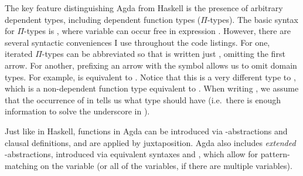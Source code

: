 The key feature distinguishing Agda from Haskell is the presence of arbitrary
dependent types, including dependent function types ($\Pi$-types).
The basic syntax for $\Pi$-types is
\AgdaSymbol{(}\AgdaSpace{}\AgdaSymbol{:}\AgdaSpace{}%
\AgdaSymbol{)}\AgdaSpace{}\AgdaSymbol{$\to$}\AgdaSpace{}%
,
where variable  can occur free in expression .
However, there are several syntactic conveniences I use throughout the code
listings.
For one, iterated $\Pi$-types can be abbreviated so that
\AgdaSymbol{(}\AgdaSpace{}\AgdaSymbol{:}\AgdaSpace{}%
\AgdaSymbol{)}\AgdaSpace{}\AgdaSymbol{$\to$}\AgdaSpace{}%
\AgdaSymbol{(}\AgdaSpace{}\AgdaSymbol{:}\AgdaSpace{}%
\AgdaSymbol{)}\AgdaSpace{}\AgdaSymbol{$\to$}\AgdaSpace{}%
is written just
\AgdaSymbol{(}\AgdaSpace{}\AgdaSymbol{:}\AgdaSpace{}%
\AgdaSymbol{)}\AgdaSpace{}%
\AgdaSymbol{(}\AgdaSpace{}\AgdaSymbol{:}\AgdaSpace{}%
\AgdaSymbol{)}\AgdaSpace{}\AgdaSymbol{$\to$}\AgdaSpace{}%
,
omitting the first arrow.
For another, prefixing an arrow with the \AgdaSymbol{$\forall$} symbol allows us
to omit domain types.
For example,
\AgdaSymbol{$\forall$}\AgdaSpace{}\AgdaSpace{}\AgdaSymbol{$\to$}%
\AgdaSpace{}
is equivalent to
\AgdaSymbol{(}\AgdaSpace{}\AgdaSymbol{:}\AgdaSpace{}%
\AgdaSymbol{\_}\AgdaSymbol{)}\AgdaSpace{}\AgdaSymbol{$\to$}%
\AgdaSpace{}.
Notice that this is a very different type to
\AgdaSpace{}\AgdaSymbol{$\to$}\AgdaSpace{},
which is a non-dependent function type equivalent to
\AgdaSymbol{(}\AgdaSymbol{\_}\AgdaSpace{}\AgdaSymbol{:}\AgdaSpace{}%
\AgdaSymbol{)}\AgdaSpace{}\AgdaSymbol{$\to$}\AgdaSpace{}%
.
When writing
\AgdaSymbol{$\forall$}\AgdaSpace{}\AgdaSpace{}\AgdaSymbol{$\to$}%
\AgdaSpace{},
we assume that the occurrence of  in  tells us what
type  should have (i.e.\ there is enough information to solve the
underscore in
\AgdaSymbol{(}\AgdaSpace{}\AgdaSymbol{:}\AgdaSpace{}%
\AgdaSymbol{\_}\AgdaSymbol{)}\AgdaSpace{}\AgdaSymbol{$\to$}%
\AgdaSpace{}).

Just like in Haskell, functions in Agda can be introduced via
\AgdaSymbol{$\uplambda$}-abstractions and clausal definitions, and are applied
by juxtaposition.
Agda also includes \emph{extended} \AgdaSymbol{$\uplambda$}-abstractions,
introduced via equivalent syntaxes
\AgdaSymbol{$\uplambda$}\AgdaSpace{}\AgdaSpace{}%
\AgdaSpace{}\AgdaSymbol{$\to$}\AgdaSpace{} and
\AgdaSymbol{$\uplambda$}\AgdaSpace{}\AgdaSymbol{\{}\AgdaSpace{}%
\AgdaSpace{}\AgdaSymbol{$\to$}\AgdaSpace{}%
\AgdaSpace{}\AgdaSymbol{\}},
which allow for pattern-matching on the variable  (or all of the
variables, if there are multiple variables).


